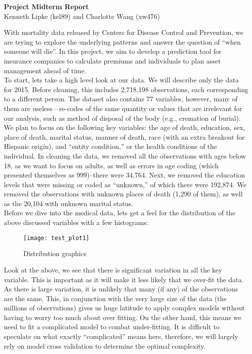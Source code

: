 \documentclass{article}
\begin{document}
\begin{center}
{\Large \textbf{Project Midterm Report}}\\
Kenneth Lipke (kel89) and Charlotte Wang (xw476)
\end{center}
 


With mortality data released by Centers for Disease Control and Prevention, we are trying to explore the underlying patterns and answer the question of ``when someone will die''. In this project, we aim to develop a prediction tool for insurance companies to calculate premiums and individuals to plan asset management ahead of time.\\ 



To start, lets take a high level look at our data. We will describe only the data for 2015. Before cleaning, this includes 2,718,198 observations, each corresponding to a different person. The dataset also contains 77 variables, however, many of them are useless---re-codes of the same quantity or values that are irrelevant for our analysis, such as method of disposal of the body (e.g., cremation of burial). We plan to focus on the following key variables: the age of death, education, sex, place of death, marital status, manner of death, race (with an extra breakout for Hispanic origin), and ``entity condition,'' or the health conditions of the individual. In cleaning the data, we removed all the observations with ages below 18, as we want to focus on adults, as well as errors in age coding (which presented themselves as 999)--there were 34,764. Next, we removed the education levels that were missing or coded as ``unknown,'' of which there were 192,874. We removed the observations with unknown places of death (1,290 of them), as well as the 20,104 with unknown marital status. \\

Before we dive into the medical data, lets get a feel for the distribution of the above discussed variables with a few histograms:
\begin{figure}[h] \label{distribution}
\caption{Distribution graphics}
\begin{center}
\texttt{[image: test\_plot1]}
\end{center}
\end{figure}

Look at the above, we see that there is significant variation in all the key variable. This is important as it will make it less likely that we over-fit the data. As there is large variation, it is unlikely that many (if any) of the observations are the same. This, in conjunction with the very large size of the data (the millions of observations) gives us huge latitude to apply complex models without having to worry too much about over fitting. On the other hand, this means we need to fit a complicated model to combat under-fitting. It is difficult to speculate on what exactly ``complicated'' means here, therefore, we will largely rely on model cross validation to determine the optimal complexity.  \\
\end{document}
